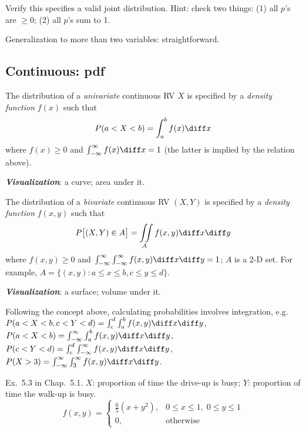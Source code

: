 \documentclass[12pt]{article}
\begin{document}
\exercise
Verify this specifies a valid joint distribution.
Hint: check two things: (1) all $p$'s are $\ge 0$;
(2) all $p$'s sum to 1.

Generalization to more than two variables: straightforward.

\subsection{Continuous: pdf}

The distribution of a \emph{univariate} continuous RV $X$
is  specified by a \emph{density function} $f(x)$ such that
\[
P(a < X < b) = \int_{a}^b f(x) \diff x
\]
where
$f(x) \ge 0$ and $\int_{-\infty}^{\infty} f(x) \diff x = 1$
(the latter is implied by the relation above).

\textbf{\emph{Visualization}}: a curve; area under it.


The distribution of a \emph{bivariate} continuous RV $(X, Y)$
is specified by a \emph{density function} $f(x, y)$ such that
\[
P\bigl[(X, Y) \in A\bigr] = \iint\limits_{A} f(x,y) \diff x \diff y
\]
where
$f(x,y) \ge 0$ and
$\int_{-\infty}^{\infty} \int_{-\infty}^{\infty} f(x,y) \diff x \diff y = 1$;
$A$ is a 2-D set.
For example,
$A = \{(x,y): a \le x \le b, c \le y \le d\}$.


\textbf{\emph{Visualization}}: a surface; volume under it.

\alert Following the concept above,
calculating probabilities involves integration,
e.g.\\
$P(a<X<b, c<Y<d) = \int_c^d \int_a^b f(x,y) \diff x\diff y$,\\
$P(a<X<b) = \int_{-\infty}^{\infty} \int_a^b f(x,y) \diff x\diff y$,\\
$P(c<Y<d) = \int_c^d \int_{-\infty}^{\infty} f(x,y) \diff x\diff y$,\\
$P(X > 3) = \int_{-\infty}^{\infty} \int_{3}^{\infty} f(x,y) \diff x\diff y$.

\example
Ex.~5.3 in Chap.~5.1.
$X$: proportion of time the drive-up is busy;
$Y$: proportion of time the walk-up is busy.
\[
f(x,y) = \begin{cases}
        \frac{6}{5}(x + y^2),
            & 0\le x \le 1,\; 0\le y \le 1\\
        0,   & \text{otherwise}
    \end{cases}
\]
\end{document}
